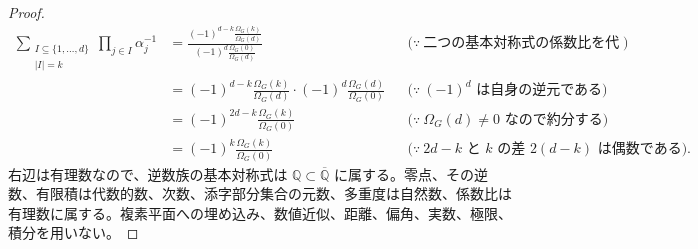 \documentclass[11pt,a4paper]{article}
\theoremstyle{remark}
\begin{document}
\begin{proof}
\[\begin{aligned}
\sum_{\substack{I\subseteq\{1,\ldots,d\}\\|I|=k}}
\prod_{j\in I}\alpha_j^{-1}
&=
\frac{
  \displaystyle
  (-1)^{d-k}\frac{\Omega_G(k)}{\Omega_G(d)}
}{
  \displaystyle
  (-1)^d\frac{\Omega_G(0)}{\Omega_G(d)}
}
&&\bigl(\because\ \text{二つの基本対称式の係数比を代入する}\bigr)\\
&=
(-1)^{d-k}\frac{\Omega_G(k)}{\Omega_G(d)}
\cdot
(-1)^d\frac{\Omega_G(d)}{\Omega_G(0)}
&&\bigl(\because\ (-1)^d\text{ は自身の逆元である}\bigr)\\
&=
(-1)^{2d-k}\frac{\Omega_G(k)}{\Omega_G(0)}
&&\bigl(\because\ \Omega_G(d)\ne0\text{ なので約分する}\bigr)\\
&=
(-1)^k\frac{\Omega_G(k)}{\Omega_G(0)}
&&\bigl(\because\ 2d-k\text{ と }k\text{ の差 }2(d-k)\text{ は偶数である}\bigr).
\end{aligned}\]
右辺は有理数なので、逆数族の基本対称式は 
$\mathbb Q\subset\overline{\mathbb Q}$
 に属する。零点、その逆数、有限積は代数的数、次数、添字部分集合の元数、多重度は自然数、係数比は有理数に属する。複素平面への埋め込み、数値近似、距離、偏角、実数、極限、積分を用いない。

\end{proof}
\end{document}
